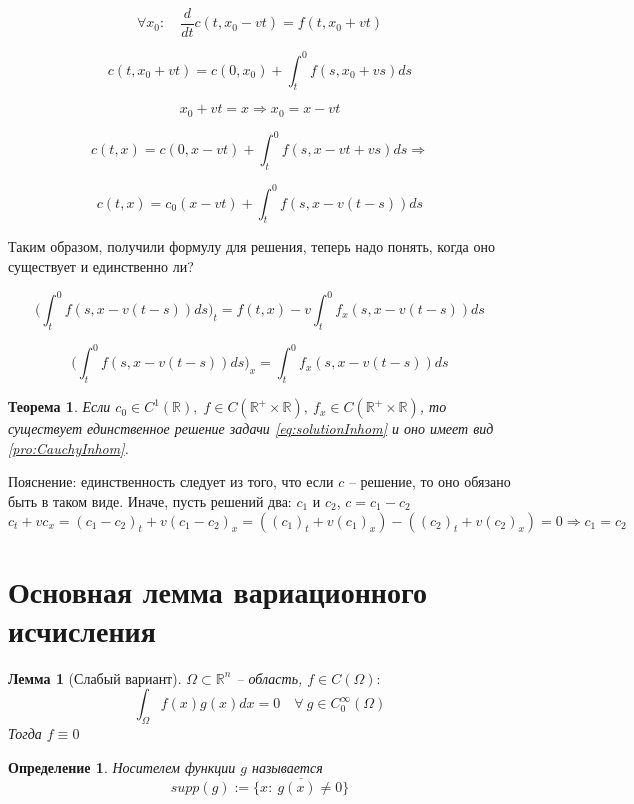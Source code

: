 \documentclass[12pt]{report}
\newtheorem{definition}{Определение}
\newtheorem{theorem}{Теорема}
\newtheorem{lemma}{Лемма}
\begin{document}
$$\forall x_0: \quad \frac{d}{dt}c(t, x_0 - vt) = f(t, x_0 + vt)$$

$$c(t, x_0 + vt) = c(0,x_0) + \int^{0}_{t}{f(s, x_0 + vs)ds}$$

$$x_0 + vt = x \Longrightarrow x_0 = x - vt$$

$$c(t,x) = c(0, x - vt) + \int^{0}_{t}{f(s, x - vt + vs)ds} \Longrightarrow $$

\begin{equation} \label{eq:solutionInhom}
    c(t, x) = c_0(x - vt) + \int^{0}_{t}{f(s, x - v(t - s))ds}
\end{equation}

Таким образом, получили формулу для решения, теперь надо понять, когда оно существует и единственно ли?

$$ \bigl ( \int^{0}_{t}{f(s, x - v(t-s))ds} \bigr )_t = f(t, x) - v \int^{0}_{t}{f_x(s, x - v(t - s))ds}$$

$$ \bigl ( \int^{0}_{t}{f(s, x - v(t-s))ds} \bigr )_x = \int^{0}_{t}{f_x(s, x - v(t - s))ds}$$

\begin{theorem}
    Если $c_0 \in C^1(\mathbb{R}), \; f \in C(\mathbb{R} ^ + \times \mathbb{R}), \: f_x \in C(\mathbb{R} ^ + \times \mathbb{R})$, то существует единственное решение задачи \eqref{eq:solutionInhom} и оно имеет вид \eqref{pro:CauchyInhom}.
\end{theorem}

Пояснение: единственность следует из того, что если $c$ -- решение, то оно обязано быть в таком виде. Иначе, пусть решений два: 
$c_1$ и $c_2$, $c = c_1 - c_2$
$$c_t + vc_x = (c_1 - c_2)_t + v(c_1 - c_2)_x = ((c_1)_t + v(c_1)_x) - ((c_2)_t + v(c_2)_x) = 0 \Longrightarrow c_1 = c_2$$

\section{Основная лемма вариационного исчисления}

\begin{lemma}[Слабый вариант]
    $\Omega \subset \mathbb{R} ^ n$ -- область, $f \in C(\Omega):$
    $$\int_{\Omega}{f(x)g(x)dx} = 0 \quad \forall \: g \in C_0 ^\infty (\Omega) $$
    Тогда $f \equiv 0$
\end{lemma}

\begin{definition}
    Носителем функции $g$ называется 
    $$supp(g) := \overline{\{x: \: g(x) \ne 0 \}}$$
\end{definition}
\end{document}
